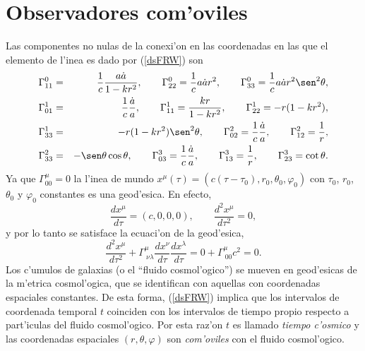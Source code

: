 \section{Observadores com'oviles}
Las componentes no nulas de la conexi'on en las coordenadas en las que el elemento de l'inea es dado por (\ref{dsFRW}) son
\begin{eqnarray} 
 \Gamma^0_{11}&=&\frac{1}{c}\frac{a\dot{a}}{1-kr^2}, \qquad \Gamma^0_{22}=\frac{1}{c}a\dot{a}r^{2}, \qquad 
\Gamma^0_{33}=\frac{1}{c}a\dot{a}r^2\sen^2\theta ,\\
\Gamma^1_{01}&=&\frac{1}{c}\frac{\dot{a}}{a}, \qquad \Gamma^1_{11}=\frac{kr}{1-kr^2}, \qquad
\Gamma^1_{22}=-r(1-kr^2),\\
 \Gamma^1_{33}&=&-r(1-kr^2)\sen^2\theta, \qquad \Gamma^2_{02}=\frac{1}{c}\frac{\dot{a}}{a}, \qquad
\Gamma^2_{12}=\frac{1}{r}, \\
\Gamma^2_{33}&=&-\sen\theta\cos\theta, \qquad \Gamma^3_{03}=\frac{1}{c}\frac{\dot{a}}{a}, \qquad
\Gamma^3_{13}=\frac{1}{r}, \qquad
\Gamma^3_{23}=\cot\theta .
\end{eqnarray}
Ya que $\Gamma^\mu_{00}=0$ la l'inea de mundo $x^\mu(\tau)=(c(\tau-\tau_0),r_0,\theta_0,\varphi_0)$ con $\tau_0$, $r_0$, $\theta_0$ y $\varphi_0$ constantes es una geod'esica. En efecto,
\begin{equation}
\frac{dx^\mu}{d\tau}=(c,0,0,0), \qquad   \frac{d^2x^\mu}{d\tau^2}=0,
\end{equation}
y por lo tanto se satisface la ecuaci'on de la geod'esica,
\begin{equation}
 \frac{d^2x^\mu}{d\tau^2}+\Gamma^\mu_{\ \nu\lambda}\frac{dx^\nu}{d\tau}\frac{dx^\lambda}{d\tau}=0+\Gamma^\mu_{\ 00}c^2=0.
\end{equation}
Los c'umulos de galaxias (o el ``fluido cosmol'ogico'') se mueven en geod'esicas de la m'etrica cosmol'ogica,
que se identifican con aquellas con coordenadas espaciales constantes. De esta forma, (\ref{dsFRW}) implica que los
intervalos de coordenada temporal $t$ coinciden con los intervalos de tiempo propio respecto a part'iculas del fluido
cosmol'ogico. Por esta raz'on $t$ es llamado \textit{tiempo c'osmico} y las coordenadas espaciales $(r,\theta,\varphi)$
son \textit{com'oviles} con el fluido cosmol'ogico.
